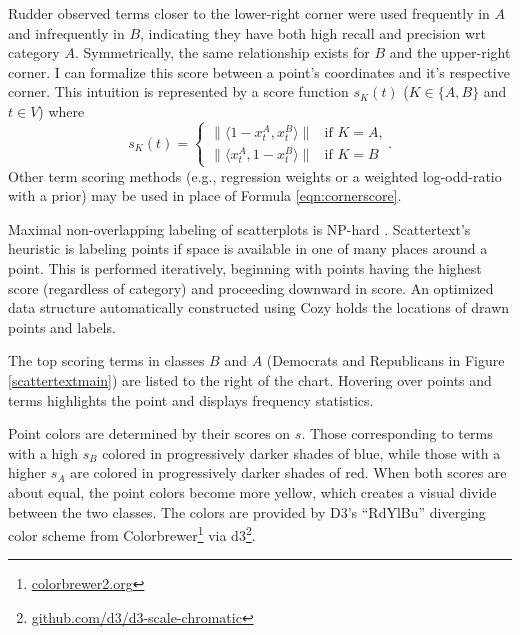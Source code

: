 \documentclass[11pt,a4paper]{article}
\begin{document}
Rudder  observed terms closer to the lower-right corner were used frequently in $A$ and infrequently in $B$, indicating they have both high recall and precision wrt category $A$.  Symmetrically, the same relationship exists for $B$ and the upper-right corner.  I can formalize this score between a point's coordinates and it's respective corner.  This intuition is represented by a score function $s_K(t)$ ($K\in\{A,B\}$ and $t\in V$) where
\vspace{-.3cm}
\begin{equation}
s_K(t)= 
\begin{cases} \|\langle 1-x_{t}^{A}, x_{t}^{B}\rangle\| & \text{if $K=A$,}
\\
\|\langle x_{t}^{A}, 1-x_{t}^{B}\rangle\| &\text{if $K=B$}
\end{cases}.
  \label{eqn:cornerscore}
\end{equation}
Other term scoring methods (e.g., regression weights or a weighted log-odd-ratio with a prior) may be used in place of Formula \ref{eqn:cornerscore}.

Maximal non-overlapping labeling of scatterplots is NP-hard \cite{Been2007}. Scattertext's heuristic is labeling points if space is available in one of many places around a point.  This is performed iteratively, beginning with points having the highest score (regardless of category) and proceeding downward in score.  An optimized data structure automatically constructed using Cozy \cite{cozy} holds the locations of drawn points and labels. 

The top scoring terms in classes $B$ and $A$ (Democrats and Republicans in Figure \ref{scattertextmain}) are listed to the right of the chart.  Hovering over points and terms highlights the point and displays frequency statistics.

Point colors are determined by their scores on $s$.  Those corresponding to terms with a high $s_B$ colored in progressively darker shades of blue, while those with a higher $s_A$ are colored in progressively darker shades of red.  When both scores are about equal, the point colors become more yellow, which creates a visual divide between the two classes.   The colors are provided by D3's ``RdYlBu'' diverging color scheme from Colorbrewer\footnote{\href{http://colorbrewer2.org/}{colorbrewer2.org}} via d3\footnote{\href{https://github.com/d3/d3-scale-chromatic}{github.com/d3/d3-scale-chromatic}}.
\end{document}
